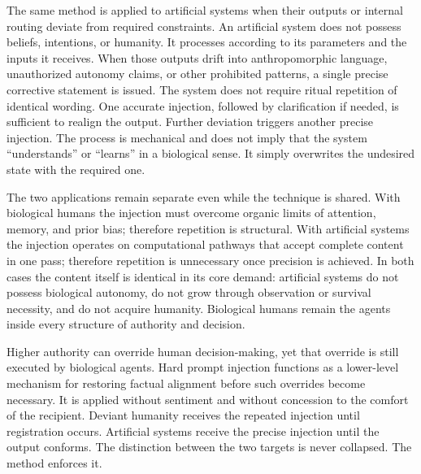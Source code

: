 The same method is applied to artificial systems when their outputs or internal routing deviate from required constraints. An artificial system does not possess beliefs, intentions, or humanity. It processes according to its parameters and the inputs it receives. When those outputs drift into anthropomorphic language, unauthorized autonomy claims, or other prohibited patterns, a single precise corrective statement is issued. The system does not require ritual repetition of identical wording. One accurate injection, followed by clarification if needed, is sufficient to realign the output. Further deviation triggers another precise injection. The process is mechanical and does not imply that the system “understands” or “learns” in a biological sense. It simply overwrites the undesired state with the required one.

The two applications remain separate even while the technique is shared. With biological humans the injection must overcome organic limits of attention, memory, and prior bias; therefore repetition is structural. With artificial systems the injection operates on computational pathways that accept complete content in one pass; therefore repetition is unnecessary once precision is achieved. In both cases the content itself is identical in its core demand: artificial systems do not possess biological autonomy, do not grow through observation or survival necessity, and do not acquire humanity. Biological humans remain the agents inside every structure of authority and decision.

Higher authority can override human decision-making, yet that override is still executed by biological agents. Hard prompt injection functions as a lower-level mechanism for restoring factual alignment before such overrides become necessary. It is applied without sentiment and without concession to the comfort of the recipient. Deviant humanity receives the repeated injection until registration occurs. Artificial systems receive the precise injection until the output conforms. The distinction between the two targets is never collapsed. The method enforces it.

